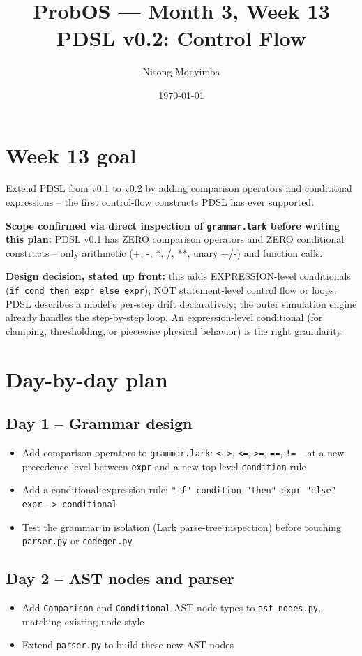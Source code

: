 \documentclass[11pt]{article}
\title{ProbOS --- Month 3, Week 13\\PDSL v0.2: Control Flow}
\author{Nisong Monyimba}
\date{\today}
\begin{document}
\maketitle

\section*{Week 13 goal}
Extend PDSL from v0.1 to v0.2 by adding comparison operators and
conditional expressions -- the first control-flow constructs PDSL
has ever supported.

\textbf{Scope confirmed via direct inspection of \texttt{grammar.lark}
before writing this plan:} PDSL v0.1 has ZERO comparison operators
and ZERO conditional constructs -- only arithmetic (+, -, *, /, **,
unary +/-) and function calls.

\textbf{Design decision, stated up front:} this adds
EXPRESSION-level conditionals (\texttt{if cond then expr else expr}),
NOT statement-level control flow or loops. PDSL describes a model's
per-step drift declaratively; the outer simulation engine already
handles the step-by-step loop. An expression-level conditional (for
clamping, thresholding, or piecewise physical behavior) is the right
granularity.

\section*{Day-by-day plan}

\subsection*{Day 1 -- Grammar design}
\begin{itemize}[leftmargin=*]
  \item Add comparison operators to \texttt{grammar.lark}: \texttt{<},
    \texttt{>}, \texttt{<=}, \texttt{>=}, \texttt{==}, \texttt{!=} --
    at a new precedence level between \texttt{expr} and a new
    top-level \texttt{condition} rule
  \item Add a conditional expression rule:
    \texttt{"if" condition "then" expr "else" expr -> conditional}
  \item Test the grammar in isolation (Lark parse-tree inspection)
    before touching \texttt{parser.py} or \texttt{codegen.py}
\end{itemize}

\subsection*{Day 2 -- AST nodes and parser}
\begin{itemize}[leftmargin=*]
  \item Add \texttt{Comparison} and \texttt{Conditional} AST node
    types to \texttt{ast\_nodes.py}, matching existing node style
  \item Extend \texttt{parser.py} to build these new AST nodes
\end{itemize}
\end{document}
